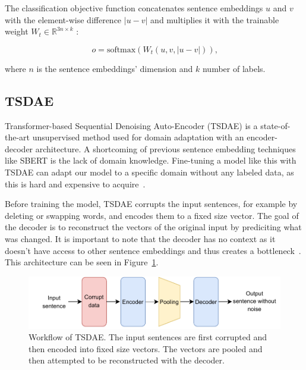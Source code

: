 \documentclass[fleqn,moreauthors,10pt]{ds_report}
\begin{document}
The classification objective function concatenates sentence embeddings \(u\) and \(v\) with the element-wise difference \(|u - v|\) and multiplies it with the trainable weight \( W_t \in \mathbb{R}^{3n \times k} \) \cite{SBERT}:

\begin{equation}
o = \text{softmax}(W_t(u, v, |u - v|)) \text{,}
\label{eq:softmax}
\end{equation}

where $n$ is the sentence embeddings' dimension and $k$ number of labels.


\subsection*{TSDAE}

Transformer-based Sequential Denoising Auto-Encoder (TSDAE) is a state-of-the-art unsupervised method used for domain adaptation with an encoder-decoder architecture. A shortcoming of previous sentence embedding techniques like SBERT is the lack of domain knowledge. Fine-tuning a model like this with TSDAE can adapt our model to a specific domain without any labeled data, as this is hard and expensive to acquire~\cite{wang-etal-2021-tsdae-using}. 

Before training the model, TSDAE corrupts the input sentences, for example by deleting or swapping words, and encodes them to a fixed size vector. The goal of the decoder is to reconstruct the vectors of the original input by prediciting what was changed. It is important to note that the decoder has no context as it doesn't have access to other sentence embeddings and thus creates a bottleneck~\cite{wang-etal-2021-tsdae-using}. This architecture can be seen in Figure~\ref{fig:tsdae}.

\begin{figure}[ht]\centering
	\vspace{12 pt}
	\includegraphics[width=\linewidth]{TSDAE_scheme.pdf}
	\vspace{5 pt}
	\caption{Workflow of TSDAE. The input sentences are first corrupted and then encoded into fixed size vectors. The vectors are pooled and then attempted to be reconstructed with the decoder.}
	\label{fig:tsdae}
\end{figure}
\end{document}

